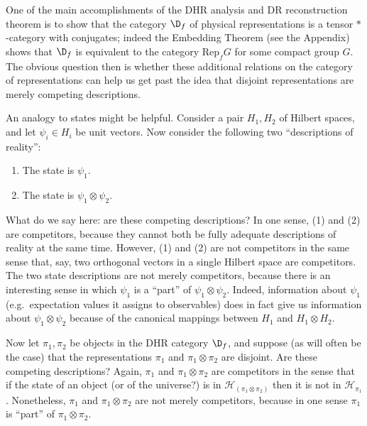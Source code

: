 \documentclass[12pt]{article}
\theoremstyle{definition}
\theoremstyle{definition}
\theoremstyle{remark}
\def\2#1{{\mathcal #1}}
\newcommand{\Rep}{\mathrm{Rep}}
\begin{document}
One of the main accomplishments of the DHR analysis and DR
reconstruction theorem is to show that the category $\D _f$ of
physical representations is a tensor $*$-category with conjugates;
indeed the Embedding Theorem (see the Appendix) shows that $\D _f$ is
equivalent to the category $\Rep _fG$ for some compact group $G$.  The
obvious question then is whether these additional relations on the
category of representations can help us get past the idea that
disjoint representations are merely competing descriptions.

An analogy to states might be helpful.  Consider a pair $H_1,H_2$ of
Hilbert spaces, and let $\psi _i\in H_i$ be unit vectors.  Now
consider the following two ``descriptions of reality'': 
\begin{enumerate}
\item The state is $\psi _1$.
\item The state is $\psi _1\otimes \psi _2$.  
\end{enumerate} 
What do we say here: are these competing descriptions?
In one sense, (1) and (2) are competitors, because they
cannot both be fully adequate descriptions of reality
at the same time.  However, (1) and (2) are not
competitors in the same sense that, say, two orthogonal
vectors in a single Hilbert space are competitors.  The
two state descriptions are not merely competitors,
because there is an interesting sense in which $\psi
_1$ is a ``part'' of $\psi _1\otimes \psi _2$.  Indeed,
information about $\psi _1$ (e.g.\ expectation values
it assigns to observables) does in fact give us
information about $\psi _1\otimes \psi _2$ because of
the canonical mappings between $H_1$ and $H_1\otimes
H_2$.

Now let $\pi _1,\pi _2$ be objects in the DHR category
$\D _f$, and suppose (as will often be the case) that
the representations $\pi _1$ and $\pi _1\otimes \pi _2$
are disjoint.  Are these competing descriptions?
Again, $\pi _1$ and $\pi _1\otimes \pi _2$ are
competitors in the sense that if the state of an object
(or of the universe?) is in $\2H _{(\pi _1\otimes \pi
  _2)}$ then it is not in $\2H _{\pi _1}$.
Nonetheless, $\pi _1$ and $\pi _1\otimes \pi _2$ are
not merely competitors, because in one sense $\pi _1$
is ``part'' of $\pi _1\otimes \pi _2$.
\end{document}
